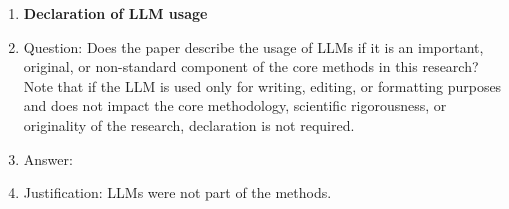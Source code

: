 \begin{enumerate}
\item {\bf Declaration of LLM usage}
 \item[] Question: Does the paper describe the usage of LLMs if it is an important, original, or non-standard component of the core methods in this research? Note that if the LLM is used only for writing, editing, or formatting purposes and does not impact the core methodology, scientific rigorousness, or originality of the research, declaration is not required.
 \item[] Answer: \answerNA{}
 \item[] Justification: LLMs were not part of the methods.

\end{enumerate}
